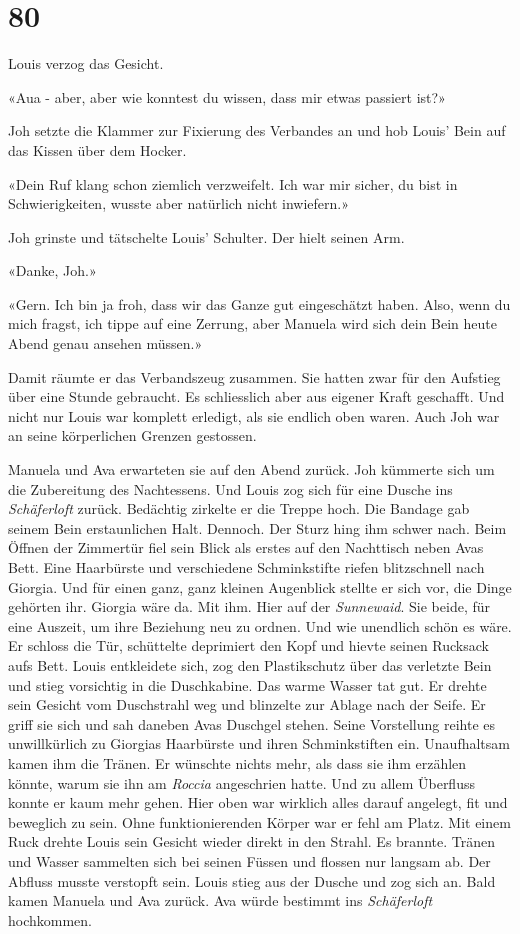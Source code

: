 \chapter{80}



Louis verzog das Gesicht.

«Aua - aber, aber wie konntest du wissen, dass mir etwas passiert ist?»

Joh setzte die Klammer zur Fixierung des Verbandes an und hob Louis’
Bein auf das Kissen über dem Hocker.

«Dein Ruf klang schon ziemlich verzweifelt. Ich war mir sicher, du bist
in Schwierigkeiten, wusste aber natürlich nicht inwiefern.»

Joh grinste und tätschelte Louis’ Schulter. Der hielt seinen Arm.

«Danke, Joh.»

«Gern. Ich bin ja froh, dass wir das Ganze gut eingeschätzt haben. Also, wenn
du mich fragst, ich tippe auf eine Zerrung, aber Manuela wird sich dein
Bein heute Abend genau ansehen müssen.»

Damit räumte er das Verbandszeug zusammen.
Sie hatten zwar für den Aufstieg über eine Stunde gebraucht. Es
schliesslich aber aus eigener Kraft geschafft. Und nicht nur Louis war
komplett erledigt, als sie endlich oben waren. Auch Joh war an seine körperlichen Grenzen gestossen.

\sectionbreak

Manuela und Ava erwarteten sie auf den Abend zurück. Joh kümmerte sich
um die Zubereitung des Nachtessens. Und Louis zog sich für eine Dusche
ins \emph{Schäferloft} zurück. Bedächtig zirkelte er die Treppe hoch.
Die Bandage gab seinem Bein erstaunlichen Halt. Dennoch. Der Sturz hing
ihm schwer nach.
Beim Öffnen der Zimmertür fiel sein Blick als erstes auf den Nachttisch
neben Avas Bett. Eine Haarbürste und verschiedene Schminkstifte riefen
blitzschnell nach Giorgia. Und für einen ganz, ganz kleinen Augenblick
stellte er sich vor, die Dinge gehörten ihr. Giorgia wäre da. Mit ihm.
Hier auf der \emph{Sunnewaid}. Sie beide, für eine Auszeit, um ihre
Beziehung neu zu ordnen. Und wie unendlich schön es wäre. Er schloss die
Tür, schüttelte deprimiert den Kopf und hievte seinen Rucksack aufs
Bett.
Louis entkleidete sich, zog den Plastikschutz über das verletzte Bein und stieg vorsichtig in
die Duschkabine.
Das warme Wasser tat gut. Er drehte sein Gesicht vom Duschstrahl weg und
blinzelte zur Ablage nach der Seife. Er griff sie sich und sah daneben
Avas Duschgel stehen. Seine Vorstellung reihte es unwillkürlich zu
Giorgias Haarbürste und ihren Schminkstiften ein. Unaufhaltsam kamen ihm die
Tränen. Er wünschte nichts mehr, als dass sie ihm erzählen
könnte, warum sie ihn am \emph{Roccia} angeschrien hatte. Und zu allem
Überfluss konnte er kaum mehr gehen. Hier oben war wirklich alles darauf
angelegt, fit und beweglich zu sein. Ohne funktionierenden Körper war er
fehl am Platz. Mit einem Ruck drehte Louis sein Gesicht wieder direkt in
den Strahl. Es brannte. Tränen und Wasser sammelten sich bei seinen
Füssen und flossen nur langsam ab. Der Abfluss musste verstopft sein.
Louis stieg aus der Dusche und zog sich an. Bald kamen Manuela und Ava
zurück. Ava würde bestimmt ins \emph{Schäferloft} hochkommen.

